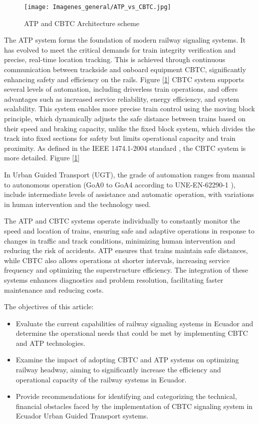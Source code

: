 \documentclass[conference]{IEEEtran}
\begin{document}
\begin{figure}[htbp]
    \centering
    \centerline{\texttt{[image: Imagenes\_general/ATP\_vs\_CBTC.jpg]}}
    \caption{ATP and CBTC Architecture scheme}
    \label{ATP Architecture diagram}
\end{figure}

The ATP system forms the foundation of modern railway signaling systems. It has evolved to meet the critical demands for train integrity verification and precise, real-time location tracking. This is achieved through continuous communication between trackside and onboard equipment CBTC, significantly enhancing safety and efficiency on the rails. Figure [\ref{ATP Architecture diagram}]
CBTC system supports several levels of automation, including driverless train operations, and offers advantages such as increased service reliability, energy efficiency, and system scalability. This system enables more precise train control using the moving block principle, which dynamically adjusts the safe distance between trains based on their speed and braking capacity, unlike the fixed block system, which divides the track into fixed sections for safety but limits operational capacity and train proximity. As defined in the IEEE 1474.1-2004 standard \cite{b1}, the CBTC system is more detailed. Figure [\ref{ATP Architecture diagram}]

In Urban Guided Transport (UGT), the grade of automation ranges from manual to autonomous operation (GoA0 to GoA4 according to UNE-EN-62290-1 \cite{b17}), include intermediate levels of assistance and automatic operation, with variations in human intervention and the technology used.

The ATP and CBTC systems operate individually to constantly monitor the speed and location of trains, ensuring safe and adaptive operations in response to changes in traffic and track conditions, minimizing human intervention and reducing the risk of accidents. ATP ensures that trains maintain safe distances, while CBTC also allows operations at shorter intervals, increasing service frequency and optimizing the superstructure efficiency. The integration of these systems enhances diagnostics and problem resolution, facilitating faster maintenance and reducing costs.

The objectives of this article:
\begin{itemize}
\item Evaluate the current capabilities of railway signaling systems in Ecuador and determine the operational needs that could be met by implementing CBTC and ATP technologies.
\item Examine the impact of adopting CBTC and ATP systems on optimizing railway headway, aiming to significantly increase the efficiency and operational capacity of the railway systems in Ecuador.
\item Provide recommendations for identifying and categorizing the technical, financial obstacles faced by the implementation of CBTC signaling system in Ecuador Urban Guided Transport systems.
\end{itemize}
\end{document}
